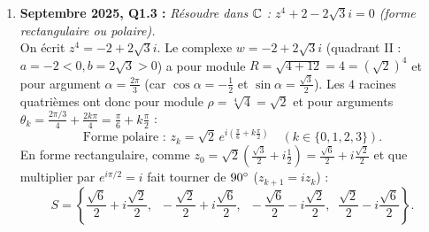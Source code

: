 \begin{exemple}
\begin{enumerate}
    \item \textbf{Septembre 2025, Q1.3 :} \emph{Résoudre dans $\mathbb{C}$ : $z^4 + 2 - 2\sqrt{3}i = 0$ (forme rectangulaire ou polaire).}\\
    On écrit $z^4 = -2 + 2\sqrt{3}i$. Le complexe $w = -2 + 2\sqrt{3}i$ (quadrant II : $a = -2 < 0, b = 2\sqrt{3} > 0$) a pour module $R = \sqrt{4 + 12} = 4 = (\sqrt{2})^4$ et pour argument $\alpha = \frac{2\pi}{3}$ (car $\cos\alpha = -\frac{1}{2}$ et $\sin\alpha = \frac{\sqrt{3}}{2}$).
    Les $4$ racines quatrièmes ont donc pour module $\rho = \sqrt[4]{4} = \sqrt{2}$ et pour arguments $\theta_k = \frac{2\pi/3}{4} + \frac{2k\pi}{4} = \frac{\pi}{6} + k\frac{\pi}{2}$ :
    \[
        \boxed{\text{Forme polaire : } z_k = \sqrt{2}\, e^{i\left(\frac{\pi}{6} + k\frac{\pi}{2}\right)} \quad (k \in \{0, 1, 2, 3\})}.
    \]
    En forme rectangulaire, comme $z_0 = \sqrt{2}\left(\frac{\sqrt{3}}{2} + i\frac{1}{2}\right) = \frac{\sqrt{6}}{2} + i\frac{\sqrt{2}}{2}$ et que multiplier par $e^{i\pi/2} = i$ fait tourner de $90\degree$ ($z_{k+1} = i z_k$) :
    \[
        \boxed{S = \left\{\frac{\sqrt{6}}{2} + i\frac{\sqrt{2}}{2},\;\; -\frac{\sqrt{2}}{2} + i\frac{\sqrt{6}}{2},\;\; -\frac{\sqrt{6}}{2} - i\frac{\sqrt{2}}{2},\;\; \frac{\sqrt{2}}{2} - i\frac{\sqrt{6}}{2}\right\}}.
    \]
\end{enumerate}
\end{exemple}

